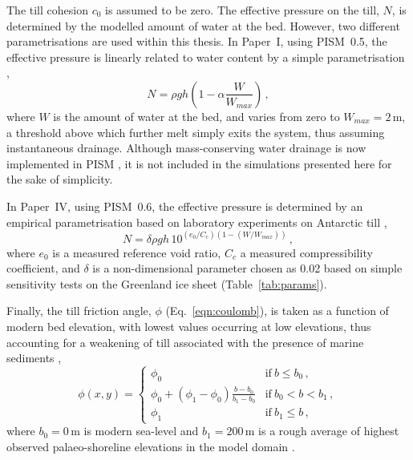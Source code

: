 \documentclass[a4paper]{kappa}
\newcommand{\CCLI}[0]{Paper~I}      %
\newcommand{\CCYC}[0]{Paper~IV}     %
\begin{document}
The till cohesion $c_0$ is assumed to be zero.
The effective pressure on the
till, $N$, is determined by the modelled amount of water at the bed. However,
two different parametrisations are used within this thesis. In {\CCLI}, using
PISM~0.5, the effective pressure is linearly related to water content by a
simple parametrisation \citep[Eq.~13]{Winkelmann.etal.2011},
\begin{equation}
    N = \rho gh (1 - \alpha \frac{W}{W_{max}}) \,,
\end{equation}
where $W$ is the amount of water at the bed, and varies from zero to
$W_{max}=2$\,m, a threshold above which further melt simply exits the system,
thus assuming instantaneous drainage. Although mass-conserving water drainage
is now implemented in PISM \citep{Bueler.Pelt.2014}, it is not included in the
simulations presented here for the sake of simplicity.

In {\CCYC}, using PISM~0.6, the effective pressure is determined by an
empirical parametrisation based on laboratory experiments on Antarctic till
\citep{Tulaczyk.etal.2000, Bueler.Pelt.2014},
\begin{equation}
    N = \delta \rho gh \, 10^{(e_0/C_c) (1 - (W/W_{max}))} \,,
\end{equation}
where $e_0$ is a measured reference void ratio, $C_c$ a measured
compressibility coefficient, and $\delta$ is a non-dimensional parameter
chosen as 0.02 based on simple sensitivity tests on the Greenland ice sheet
(Table~\ref{tab:params}).

Finally, the till friction angle, $\phi$ (Eq.~\ref{eqn:coulomb}), is taken as a
function of modern bed
elevation, with lowest values occurring at low elevations, thus accounting for
a weakening of till associated with the presence of marine sediments
\citep[cf.][Eq.~10]{Martin.etal.2011},
\begin{equation}
    \phi(x,y) =
    \begin{cases}
        \phi_0 & \text{if}\ b \le b_0 \,, \\
        \phi_0 + (\phi_1-\phi_0) \frac{b - b_0}{b_1-b_0}
                & \text{if}\ b_0 < b < b_1 \,, \\
        \phi_1 & \text{if}\ b_1 \le b \,,
    \end{cases}
\end{equation}
where $b_0=0$\,m is modern sea-level and $b_1=200$\,m is a rough average of
highest observed palaeo-shoreline elevations in the model domain
\citep[\cref{tab:params};][]{Clague.James.2002}.
\end{document}
